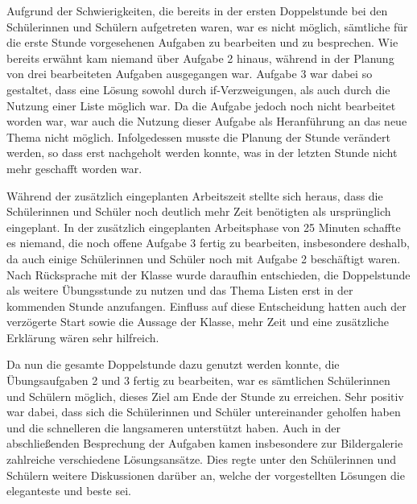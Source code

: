 Aufgrund der Schwierigkeiten, die bereits in der ersten Doppelstunde bei den Schülerinnen und Schülern aufgetreten waren, war es nicht möglich, sämtliche für die erste Stunde vorgesehenen Aufgaben zu bearbeiten und zu besprechen.
Wie bereits erwähnt kam niemand über Aufgabe 2 hinaus, während in der Planung von drei bearbeiteten Aufgaben ausgegangen war.
Aufgabe 3 war dabei so gestaltet, dass eine Lösung sowohl durch if-Verzweigungen, als auch durch die Nutzung einer Liste möglich war.
Da die Aufgabe jedoch noch nicht bearbeitet worden war, war auch die Nutzung dieser Aufgabe als Heranführung an das neue Thema nicht möglich.
Infolgedessen musste die Planung der Stunde verändert werden, so dass erst nachgeholt werden konnte, was in der letzten Stunde nicht mehr geschafft worden war.

Während der zusätzlich eingeplanten Arbeitszeit stellte sich heraus, dass die Schülerinnen und Schüler noch deutlich mehr Zeit benötigten als ursprünglich eingeplant.
In der zusätzlich eingeplanten Arbeitsphase von 25 Minuten schaffte es niemand, die noch offene Aufgabe 3 fertig zu bearbeiten, insbesondere deshalb, da auch einige Schülerinnen und Schüler noch mit Aufgabe 2 beschäftigt waren.
Nach Rücksprache mit der Klasse wurde daraufhin entschieden, die Doppelstunde als weitere Übungsstunde zu nutzen und das Thema Listen erst in der kommenden Stunde anzufangen.
Einfluss auf diese Entscheidung hatten auch der verzögerte Start sowie die Aussage der Klasse, mehr Zeit und eine zusätzliche Erklärung wären sehr hilfreich.

Da nun die gesamte Doppelstunde dazu genutzt werden konnte, die Übungsaufgaben 2 und 3 fertig zu bearbeiten, war es sämtlichen Schülerinnen und Schülern möglich, dieses Ziel am Ende der Stunde zu erreichen.
Sehr positiv war dabei, dass sich die Schülerinnen und Schüler untereinander geholfen haben und die schnelleren die langsameren unterstützt haben.
Auch in der abschließenden Besprechung der Aufgaben kamen insbesondere zur Bildergalerie zahlreiche verschiedene Lösungsansätze.
Dies regte unter den Schülerinnen und Schülern weitere Diskussionen darüber an, welche der vorgestellten Lösungen die eleganteste und beste sei.

